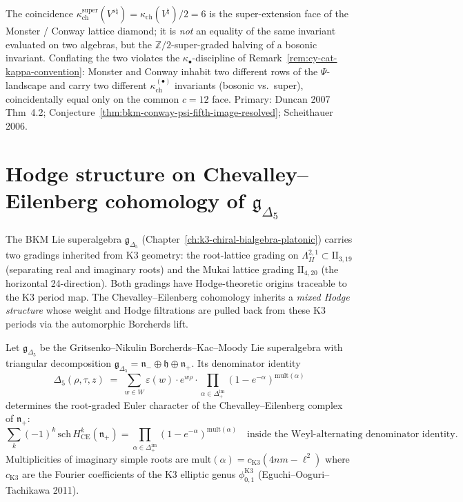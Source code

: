 \begin{remark}
The coincidence $\kappa_{\mathrm{ch}}^{\mathrm{super}}(V^{s\natural})
= \kappa_{\mathrm{ch}}(V^\natural)/2 = 6$ is the super-extension
face of the Monster / Conway lattice diamond;
it is \emph{not} an equality of the same invariant evaluated on
two algebras, but the $\mathbb{Z}/2$-super-graded halving of a
bosonic invariant. Conflating the two violates
the $\kappa_\bullet$-discipline of
Remark~\ref{rem:cy-cat-kappa-convention}: Monster and Conway
inhabit two different rows of the $\Psi$-landscape and
carry two different $\kappa_{\mathrm{ch}}^{(\bullet)}$ invariants
(bosonic vs.\ super), coincidentally equal only on the common
$c = 12$ face. Primary: Duncan 2007 Thm~4.2;
Conjecture~\textup{\ref{thm:bkm-conway-psi-fifth-image-resolved}};
Scheithauer 2006.
\end{remark}

\section{Hodge structure on Chevalley--Eilenberg cohomology of \texorpdfstring{$\mathfrak{g}_{\Delta_5}$}{g-Delta-5}}
\label{sec:cycat-ce-hodge-delta5}

The BKM Lie superalgebra $\mathfrak{g}_{\Delta_5}$ (Chapter~\textup{\ref{ch:k3-chiral-bialgebra-platonic}})
carries two gradings inherited from K3 geometry: the root-lattice
grading on $\Lambda^{2,1}_{II} \subset \mathrm{II}_{3,19}$
(separating real and imaginary roots) and the Mukai lattice grading
$\mathrm{II}_{4,20}$ (the horizontal 24-direction). Both gradings
have Hodge-theoretic origins traceable to the K3 period map. The
Chevalley--Eilenberg cohomology inherits a \emph{mixed Hodge structure}
whose weight and Hodge filtrations are pulled back from these K3
periods via the automorphic Borcherds lift.

\begin{proposition}
\label{thm:cycat-ce-sum-positive-roots}
Let $\mathfrak{g}_{\Delta_5}$ be the Gritsenko--Nikulin
Borcherds--Kac--Moody Lie superalgebra with triangular decomposition
$\mathfrak{g}_{\Delta_5}=\mathfrak n_-\oplus\mathfrak h\oplus
\mathfrak n_+$. Its denominator identity
\[
 \Delta_5(\rho, \tau, z) \;=\;
 \sum_{w \in W} \varepsilon(w) \cdot e^{w\rho} \cdot
 \prod_{\alpha \in \Delta_+^{\mathrm{im}}}
 (1 - e^{-\alpha})^{\mathrm{mult}(\alpha)}
\]
determines the root-graded Euler character of the Chevalley--Eilenberg
complex of $\mathfrak n_+$:
\[
 \sum_k(-1)^k\,\mathrm{sch}\,H^k_{\mathrm{CE}}(\mathfrak n_+)
 =
 \prod_{\alpha\in\Delta_+^{\mathrm{im}}}
 (1-e^{-\alpha})^{\mathrm{mult}(\alpha)}
 \quad\text{inside the Weyl-alternating denominator identity.}
\]
Multiplicities of imaginary simple
roots are $\mathrm{mult}(\alpha) = c_{\mathrm{K3}}(4nm - \ell^2)$ where
$c_{\mathrm{K3}}$ are the Fourier coefficients of the K3 elliptic
genus $\phi_{0,1}^{\mathrm{K3}}$ (Eguchi--Ooguri--Tachikawa 2011).
\end{proposition}

